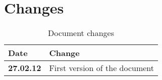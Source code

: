 \pagebreak

\section{Changes}

\begin{table}[h!]
\begin{tabular}{ | p{90pt} | p{270pt}  |}
\hline
\bf Date & \bf Change \\ \hline
\bf 27.02.12  &  First version of the document  \\ \hline

\end{tabular}
\caption{Document changes}
\end{table}




